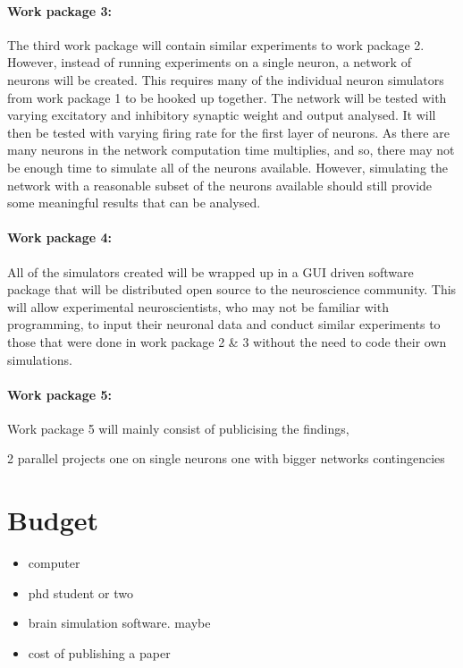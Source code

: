 \documentclass{epsrc}
\begin{document}
\subsection{Work package 3:}
\noindent
The third work package will contain similar experiments to work package 2. However, instead of running experiments on a single neuron, a network of neurons will be created. This requires many of the individual neuron simulators from work package 1 to be hooked up together. The network will be tested with varying excitatory and inhibitory synaptic weight and output analysed. It will then be tested with varying firing rate for the first layer of neurons. As there are many neurons in the network computation time multiplies, and so, there may not be enough time to simulate all of the neurons available. However, simulating the network with a reasonable subset of the neurons available should still provide some meaningful results that can be analysed.
\\
\subsection{Work package 4:}
\noindent	
All of the simulators created will be wrapped up in a GUI driven software package that will be distributed open source to the neuroscience community. This will allow experimental neuroscientists, who may not be familiar with programming, to input their neuronal data and conduct similar experiments to those that were done in work package 2 \& 3 without the need to code their own simulations.
\\
\subsection{Work package 5:}
Work package 5 will mainly consist of publicising the findings, 

2 parallel projects 
one on single neurons
one with bigger networks 
contingencies

\part{Budget}
\begin{itemize}
\item computer
\item phd student or two
\item brain simulation software. maybe 
\item cost of publishing a paper
\end{itemize}
\end{document}
